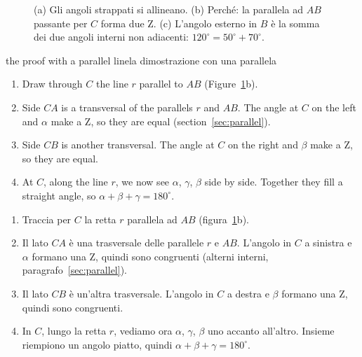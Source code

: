 \begin{figure}[htbp]
%
      {(a) Gli angoli strappati si allineano. (b) Perché: la parallela ad $AB$ passante per $C$ forma due Z. (c) L'angolo esterno in $B$ è la somma dei due angoli interni non adiacenti: $120^\circ = 50^\circ + 70^\circ$.}
\label{fig:sum}
\end{figure}

\begin{rebuild}{the proof with a parallel line}{la dimostrazione con una parallela}
\begin{enumerate}[label=\arabic*.]
\item Draw through $C$ the line $r$ parallel to $AB$ (Figure~\ref{fig:sum}b).
\item Side $CA$ is a transversal of the parallels $r$ and $AB$. The angle at $C$ on the left and $\alpha$ make a Z, so they are equal (section~\ref{sec:parallel}).
\item Side $CB$ is another transversal. The angle at $C$ on the right and $\beta$ make a Z, so they are equal.
\item At $C$, along the line $r$, we now see $\alpha$, $\gamma$, $\beta$ side by side. Together they fill a straight angle, so $\alpha + \beta + \gamma = 180^\circ$.
\end{enumerate}
\tcblower
\begin{enumerate}[label=\arabic*.]
\item Traccia per $C$ la retta $r$ parallela ad $AB$ (figura~\ref{fig:sum}b).
\item Il lato $CA$ è una trasversale delle parallele $r$ e $AB$. L'angolo in $C$ a sinistra e $\alpha$ formano una Z, quindi sono congruenti (alterni interni, paragrafo~\ref{sec:parallel}).
\item Il lato $CB$ è un'altra trasversale. L'angolo in $C$ a destra e $\beta$ formano una Z, quindi sono congruenti.
\item In $C$, lungo la retta $r$, vediamo ora $\alpha$, $\gamma$, $\beta$ uno accanto all'altro. Insieme riempiono un angolo piatto, quindi $\alpha + \beta + \gamma = 180^\circ$.
\end{enumerate}
\end{rebuild}

